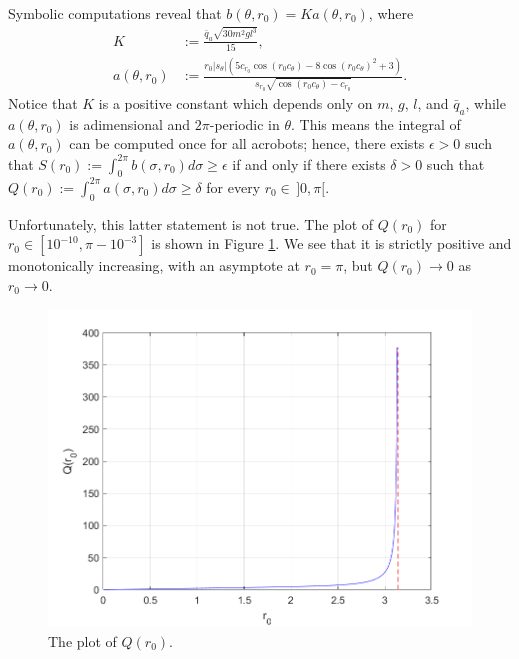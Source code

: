 \documentclass[journal,twoside,web, twocolumn,draftcls]{ieeecolor}
\begin{document}
Symbolic computations reveal that
\(b(\theta,r_0) = K a(\theta,r_0)\),
where
\begin{align*}
    K &:= \frac{\bar{q}_a \sqrt{30m^2g l^3}}{15}
    , \\
    a(\theta,r_0) &:= \frac{
        r_0 |s_\theta| \left(
        5 c_{r_0} \cos(r_0 c_\theta) - 8 \cos(r_0c_\theta)^2 + 3
    \right)
    }{
    s_{r_0}\sqrt{\cos(r_0c_\theta) - c_{r_0}}
    }
    .
\end{align*}
Notice that \(K\) is a positive constant which depends only on
\(m\), \(g\), \(l\), and \(\bar{q}_a\), while \(a(\theta,r_0)\) is adimensional
and \(2\pi\)-periodic in \(\theta\).
This means the integral of \(a(\theta,r_0)\) can be computed once for all
acrobots; 
hence, there exists \(\epsilon > 0\) such that 
\(S(r_0) := \int_0^{2\pi} b(\sigma,r_0)d\sigma \geq \epsilon\)
if and only if there exists \(\delta > 0\) such that 
\(Q(r_0) := \int_0^{2\pi} a(\sigma,r_0) d\sigma \geq \delta\)
for every \(r_0 \in \,]0,\pi[\). 

Unfortunately, this latter statement is not true.
The plot of \(Q(r_0)\) for \(r_0 \in [10^{-10}, \pi - 10^{-3}]\) is shown in
Figure \ref{fig:acrobot-Q}.
We see that it is strictly positive and monotonically increasing, with an
asymptote at \(r_0 = \pi\), but \(Q(r_0) \to 0\) as \(r_0 \to 0\).

\begin{figure}
    \centering
    \includegraphics[width=0.8\linewidth]{Qro.png}
    \caption{The plot of \(Q(r_0)\).}
    \label{fig:acrobot-Q}
\end{figure}
\end{document}
